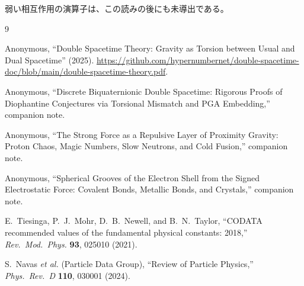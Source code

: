 \documentclass[a4paper]{article}
\begin{document}
弱い相互作用の演算子は、この読みの後にも未導出である。

\begin{thebibliography}{9}

Anonymous,
``Double Spacetime Theory: Gravity as Torsion between Usual and Dual Spacetime'' (2025).
\url{https://github.com/hypernumbernet/double-spacetime-doc/blob/main/double-spacetime-theory.pdf}.

Anonymous,
``Discrete Biquaternionic Double Spacetime: Rigorous Proofs of Diophantine Conjectures via Torsional Mismatch and PGA Embedding,''
companion note.

Anonymous,
``The Strong Force as a Repulsive Layer of Proximity Gravity: Proton Chaos, Magic Numbers, Slow Neutrons, and Cold Fusion,''
companion note.

Anonymous,
``Spherical Grooves of the Electron Shell from the Signed Electrostatic Force: Covalent Bonds, Metallic Bonds, and Crystals,''
companion note.

E.~Tiesinga, P.~J.~Mohr, D.~B.~Newell, and B.~N.~Taylor,
``CODATA recommended values of the fundamental physical constants: 2018,''
\textit{Rev.\ Mod.\ Phys.} \textbf{93}, 025010 (2021).

S.~Navas \textit{et al.} (Particle Data Group),
``Review of Particle Physics,''
\textit{Phys.\ Rev.\ D} \textbf{110}, 030001 (2024).

\end{thebibliography}
\end{document}
